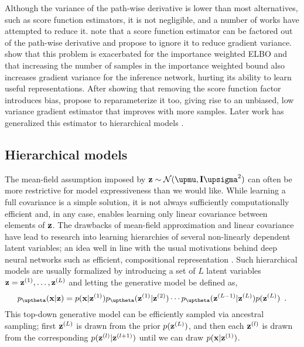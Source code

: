 Although the variance of the path-wise derivative is lower than most alternatives, such as score function estimators, it is not negligible, and a number of works have attempted to reduce it.
\textcite{roeder_sticking_2017} note that a score function estimator can be factored out of the path-wise derivative and propose to ignore it to reduce gradient variance. 
\textcite{rainforth_tighter_2019} show that this problem is exacerbated for the importance weighted ELBO \parencite{burda_importance_2016} and that increasing the number of samples in the importance weighted bound also increases gradient variance for the inference network, hurting its ability to learn useful representations. 
After showing that removing the score function factor introduces bias, \textcite{tucker_doubly_2019} propose to reparameterize it too, giving rise to an unbiased, low variance gradient estimator that improves with more samples. Later work has generalized this estimator to hierarchical models \parencite{bauer_generalized_2021}. 


\subsection{Hierarchical models}\label{sec:hierarchical-vae-background}
The mean-field assumption imposed by $\zb \sim\mathcal{N}(\mub,\mathbf{I}\sigmab^2)$ can often be more restrictive for model expressiveness than we would like. 
While learning a full covariance is a simple solution, it is not always sufficiently computationally efficient and, in any case, enables learning only linear covariance between elements of ${\mathbf{z}}$. 
The drawbacks of mean-field approximation and linear covariance have lead to research into learning hierarchies of several non-linearly dependent latent variables; an idea well in line with the usual motivations behind deep neural networks such as efficient, compositional representation \cite{lecun_deep_2015}. 
Such hierarchical models are usually formalized by introducing a set of $L$ latent variables  ${\mathbf{z}}={\mathbf{z}}^{(1)}, \dots, {\mathbf{z}}^{(L)}$ and letting the generative model be defined as,
%
\begin{equation}
    p_\thetab(\xb|\zb)=p(\xb|\zb^{(1)}) p_\thetab(\zb^{(1)}|\zb^{(2)}) \cdots p_\thetab(\zb^{(L-1)}|\zb^{(L)}) p(\zb^{(L)}) \enspace .
\end{equation}
%
This top-down generative model can be efficiently sampled via ancestral sampling; first ${\mathbf{z}}^{(L)}$ is drawn from the prior $p({\mathbf{z}}^{(L)})$, and then each ${\mathbf{z}}^{(l)}$ is drawn from the corresponding $p({\mathbf{z}}^{(l)}|{\mathbf{z}}^{(l+1)})$ until we can draw $p({\mathbf{x}}|{\mathbf{z}}^{(1)})$. 

